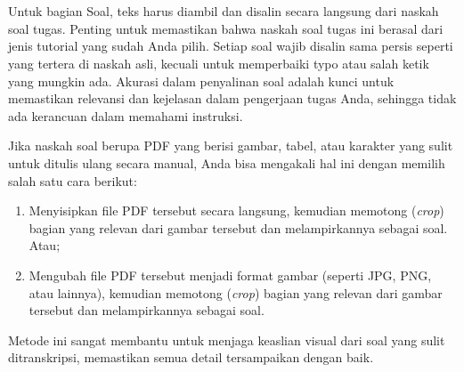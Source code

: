 %
%
%
\section{\Soal}


Untuk bagian Soal, teks harus diambil dan disalin secara langsung dari naskah soal tugas. Penting untuk memastikan bahwa naskah soal tugas ini berasal dari jenis tutorial yang sudah Anda pilih. Setiap soal wajib disalin sama persis seperti yang tertera di naskah asli, kecuali untuk memperbaiki typo atau salah ketik yang mungkin ada. Akurasi dalam penyalinan soal adalah kunci untuk memastikan relevansi dan kejelasan dalam pengerjaan tugas Anda, sehingga tidak ada kerancuan dalam memahami instruksi.

Jika naskah soal berupa PDF yang berisi gambar, tabel, atau karakter yang sulit untuk ditulis ulang secara manual, Anda bisa mengakali hal ini dengan memilih salah satu cara berikut: 

\begin{enumerate}
    \item Menyisipkan file PDF tersebut secara langsung, kemudian memotong (\textit{crop}) bagian yang relevan dari gambar tersebut dan melampirkannya sebagai soal. Atau;
    \item Mengubah file PDF tersebut menjadi format gambar (seperti JPG, PNG, atau lainnya), kemudian memotong (\textit{crop}) bagian yang relevan dari gambar tersebut dan melampirkannya sebagai soal.
\end{enumerate}

Metode ini sangat membantu untuk menjaga keaslian visual dari soal yang sulit ditranskripsi, memastikan semua detail tersampaikan dengan baik.